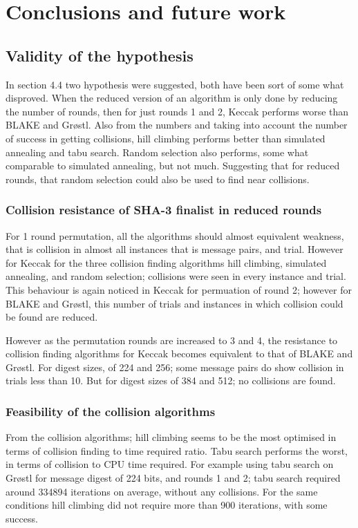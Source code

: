 \chapter{Conclusions and future work}

\section{Validity of the hypothesis}

In section 4.4 two hypothesis were suggested, both have been sort of some what disproved. When the reduced version
of an algorithm is only done by reducing the number of rounds, then for just rounds 1 and 2, Keccak performs worse
than BLAKE and Gr{\o}stl. Also from the numbers and taking into account the number of success in getting collisions,
hill climbing performs better than simulated annealing and tabu search. Random selection also performs, some what 
comparable to simulated annealing, but not much. Suggesting that for reduced rounds, that random selection could
also be used to find near collisions.

\subsection{Collision resistance of SHA-3 finalist in reduced rounds}

For 1 round permutation, all the algorithms should almost equivalent weakness, that is collision in almost all instances
that is message pairs, and trial. However for Keccak for the three collision finding algorithms hill climbing, simulated
annealing, and random selection; collisions were seen in every instance and trial. This behaviour is again noticed
in Keccak for permuation of round 2; however for BLAKE and Gr{\o}stl, this number of trials and instances in which
collision could be found are reduced.

However as the permutation rounds are increased to 3 and 4, the resistance to collision finding algorithms for Keccak
becomes equivalent to that of BLAKE and Gr{\o}stl. For digest sizes, of 224 and 256; some message pairs do show
collision in trials less than 10. But for digest sizes of 384 and 512; no collisions are found.

\subsection{Feasibility of the collision algorithms}

From the collision algorithms; hill climbing seems to be the most optimised in terms of collision finding to time required
ratio. Tabu search performs the worst, in terms of collision to CPU time required. For example using tabu search on 
Gr{\o}stl for message digest of 224 bits, and rounds 1 and 2; tabu search required around 334894 iterations on average,
without any collisions. For the same conditions hill climbing did not require more than 900 iterations, with some success.

